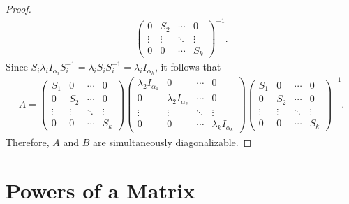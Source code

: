\begin{proof}
\begin{align*}
\begin{pmatrix}
            0 & S_{2} & \cdots & 0 \\
            \vdots & \vdots & \ddots & \vdots \\
            0 & 0 & \cdots & S_{k}
        \end{pmatrix}^{-1}.
    \end{align*}
    Since $S_i\lambda_i I_{\alpha_i}S_i^{-1} = \lambda_i S_iS_i^{-1} = \lambda_i I_{\alpha_k}$, it follows that
    \begin{align*}
        A = \begin{pmatrix}
            S_{1} & 0 & \cdots & 0 \\
            0 & S_{2} & \cdots & 0 \\
            \vdots & \vdots & \ddots & \vdots \\
            0 & 0 & \cdots & S_{k}
        \end{pmatrix}\begin{pmatrix}
            \lambda_2 I_{\alpha_1} & 0 & \cdots & 0 \\
            0 & \lambda_2 I_{\alpha_2} & \cdots & 0 \\
            \vdots & \vdots & \ddots & \vdots \\
            0 & 0 & \cdots & \lambda_k I_{\alpha_k}
        \end{pmatrix}\begin{pmatrix}
            S_{1} & 0 & \cdots & 0 \\
            0 & S_{2} & \cdots & 0 \\
            \vdots & \vdots & \ddots & \vdots \\
            0 & 0 & \cdots & S_{k}
        \end{pmatrix}^{-1}.
    \end{align*}
    Therefore, $A$ and $B$ are simultaneously diagonalizable.
\end{proof}

\section{Powers of a Matrix}

